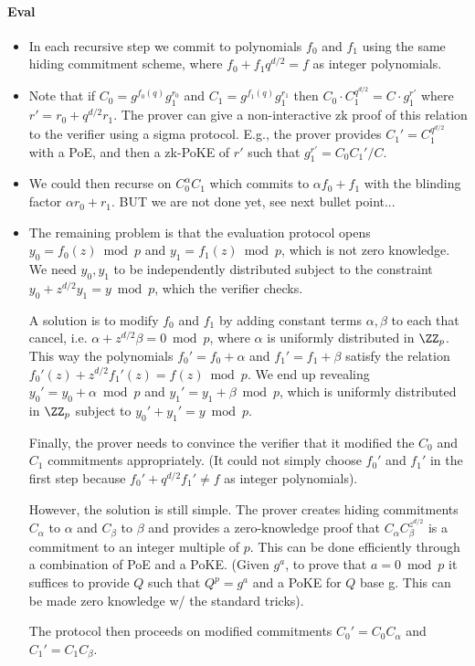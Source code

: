 \documentclass{article}
\begin{document}
\paragraph{Eval}

\begin{itemize}
\item In each recursive step we commit to polynomials $f_0$ and $f_1$ using the same hiding commitment scheme, where $f_0 + f_1 q^{d/2} = f$ as integer polynomials. 

\item Note that if $C_0 = g^{f_0(q)}g_1^{r_0}$ and $C_1 = g^{f_1(q)} g_1^{r_1}$ then $C_0 \cdot C_1^{q^{d/2}} = C \cdot g_1^{r'}$ where $r' = r_0 + q^{d/2} r_1$. The prover can give a non-interactive zk proof of this relation to the verifier using a sigma protocol. E.g., the prover provides $C_1' = C_1^{q^{d/2}}$ with a PoE, and then a zk-PoKE of $r'$ such that $g_1^{r'} = C_0 C_1' / C$. 

\item We could then recurse on $C_0^\alpha C_1$ which commits to $\alpha f_0 + f_1$ with the blinding factor $\alpha r_0 + r_1$. BUT we are not done yet, see next bullet point... 

\item The remaining problem is that the evaluation protocol opens $y_0 = f_0(z) \bmod p$ and $y_1 = f_1(z) \bmod p$, which is not zero knowledge. We need $y_0, y_1$ to be independently distributed subject to the constraint $y_0 + z^{d/2} y_1 = y \bmod p$, which the verifier checks. 

A solution is to modify $f_0$ and $f_1$ by adding constant terms $\alpha, \beta$ to each that cancel, i.e. $\alpha + z^{d/2} \beta = 0 \bmod p$, where $\alpha$ is uniformly distributed in $\ZZ_p$. This way the polynomials $f_0' = f_0 + \alpha$ and $f_1' = f_1 + \beta$ satisfy the relation $f_0'(z) + z^{d/2}f_1'(z) = f(z) \bmod p$. We end up revealing $y_0' = y_0 + \alpha \bmod p$ and $y_1' = y_1 + \beta \bmod p$, which is uniformly distributed in $\ZZ_p$ subject to $y_0' + y_1' = y \bmod p$. 

Finally, the prover needs to convince the verifier that it modified the $C_0$ and $C_1$ commitments appropriately. (It could not simply choose $f_0'$ and $f_1'$ in the first step because $f_0' + q^{d/2} f_1' \neq f$ as integer polynomials). 

However, the solution is still simple. The prover creates hiding commitments $C_\alpha$ to $\alpha$ and $C_\beta$ to $\beta$ and provides a zero-knowledge proof that $C_\alpha C_\beta ^{z^{d/2}}$ is a commitment to an integer multiple of $p$. This can be done efficiently through a combination of PoE and a PoKE. (Given $g^a$, to prove that $a = 0 \bmod p$ it suffices to provide $Q$ such that $Q^p = g^a$ and a PoKE for $Q$ base g. This can be made zero knowledge w/ the standard tricks). 

The protocol then proceeds on modified commitments $C_0' = C_0 C_\alpha$ and $C_1' = C_1 C_\beta$.

\end{itemize}
\end{document}
